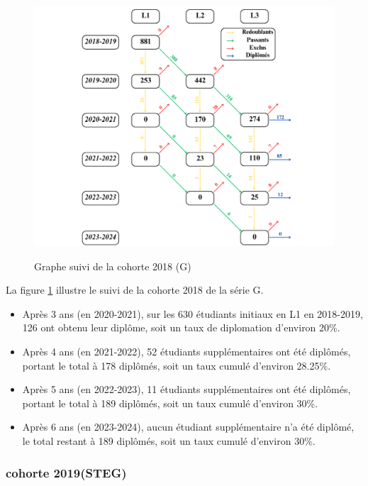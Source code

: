\begin{figure}[ht]
    \centering
    \caption{Graphe suivi de la cohorte 2018 (G)}
    \includegraphics[width=1\textwidth]{figure/G_2018.png}
    \label{fig:cohorte_g_2018}
\end{figure}

La figure \ref{fig:cohorte_g_2018} illustre le suivi de la cohorte 2018 de la série G.
\begin{itemize}
    \item Après 3 ans (en 2020-2021), sur les 630 étudiants initiaux en L1 en 2018-2019, 126 ont obtenu leur diplôme, soit un taux de diplomation d'environ 20\%.
    \item Après 4 ans (en 2021-2022), 52 étudiants supplémentaires ont été diplômés, portant le total à 178 diplômés, soit un taux cumulé d'environ 28.25\%.
    \item Après 5 ans (en 2022-2023), 11 étudiants supplémentaires ont été diplômés, portant le total à 189 diplômés, soit un taux cumulé d'environ 30\%.
    \item Après 6 ans (en 2023-2024), aucun étudiant supplémentaire n'a été diplômé, le total restant à 189 diplômés, soit un taux cumulé d'environ 30\%.
\end{itemize}

\newpage
\subsubsection{cohorte 2019(STEG)}

